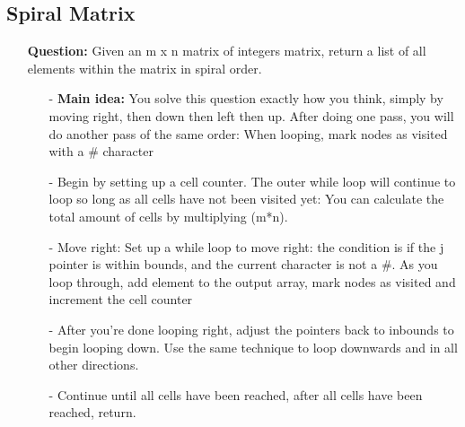 \documentclass[12pt]{article}
\begin{document}
\subsection{Spiral Matrix}
\begin{enumerate}
  \item[] \textbf{Question:} Given an m x n matrix of integers matrix, return a list of all elements within the matrix in spiral order.

    \begin{enumerate}
      \item[-] \textbf{Main idea:} You solve this question exactly how you think, simply by moving right, then down then left then up. After doing one pass, you will do another pass of the same order: When looping, mark nodes as visited with a \# character
      \item[-] Begin by setting up a cell counter. The outer while loop will continue to loop so long as all cells have not been visited yet: You can calculate the total amount of cells by multiplying (m*n). 
      \item[-] Move right: Set up a while loop to move right: the condition is if the j pointer is within bounds, and the current character is not a \#. As you loop through, add element to the output array, mark nodes as visited and increment the cell counter
      \item[-] After you're done looping right, adjust the pointers back to inbounds to begin looping down. Use the same technique to loop downwards and in all other directions. 
      \item[-] Continue until all cells have been reached, after all cells have been reached, return.

    \end{enumerate}
\end{enumerate}
\end{document}
